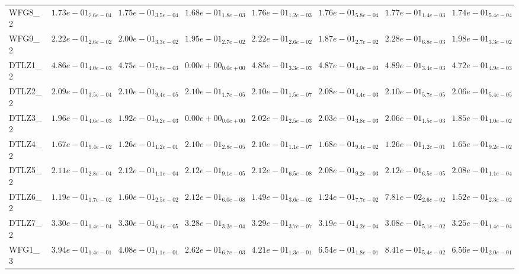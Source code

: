 \documentclass{article}
\begin{document}
\begin{landscape}
\begin{table}
\begin{scriptsize}
\begin{tabular}{llllllll}
WFG8\_2 & $  1.73e-01_{ 7.6e-04}$ & $  1.75e-01_{ 3.5e-04}$ & $  1.68e-01_{ 1.8e-03}$ & \cellcolor{gray25}$  1.76e-01_{ 1.2e-03}$ & $  1.76e-01_{ 5.8e-04}$ & \cellcolor{gray95}$  1.77e-01_{ 1.4e-03}$ & $  1.74e-01_{ 5.4e-04}$ \\
WFG9\_2 & \cellcolor{gray25}$  2.22e-01_{ 2.6e-02}$ & $  2.00e-01_{ 3.3e-02}$ & $  1.95e-01_{ 2.7e-02}$ & $  2.22e-01_{ 2.6e-02}$ & $  1.87e-01_{ 2.7e-02}$ & \cellcolor{gray95}$  2.28e-01_{ 6.8e-03}$ & $  1.98e-01_{ 3.3e-02}$ \\
DTLZ1\_2 & $  4.86e-01_{ 4.0e-03}$ & $  4.75e-01_{ 7.8e-03}$ & $  0.00e+00_{ 0.0e+00}$ & $  4.85e-01_{ 3.3e-03}$ & \cellcolor{gray25}$  4.87e-01_{ 4.0e-03}$ & \cellcolor{gray95}$  4.89e-01_{ 3.4e-03}$ & $  4.72e-01_{ 4.9e-03}$ \\
DTLZ2\_2 & $  2.09e-01_{ 3.5e-04}$ & \cellcolor{gray25}$  2.10e-01_{ 9.4e-05}$ & $  2.10e-01_{ 1.7e-05}$ & $  2.10e-01_{ 1.5e-07}$ & $  2.08e-01_{ 4.4e-03}$ & \cellcolor{gray95}$  2.10e-01_{ 5.7e-05}$ & $  2.06e-01_{ 5.4e-05}$ \\
DTLZ3\_2 & $  1.96e-01_{ 4.6e-03}$ & $  1.92e-01_{ 9.2e-03}$ & $  0.00e+00_{ 0.0e+00}$ & $  2.02e-01_{ 2.5e-03}$ & \cellcolor{gray25}$  2.03e-01_{ 3.8e-03}$ & \cellcolor{gray95}$  2.06e-01_{ 1.5e-03}$ & $  1.85e-01_{ 1.0e-02}$ \\
DTLZ4\_2 & $  1.67e-01_{ 9.4e-02}$ & $  1.26e-01_{ 1.2e-01}$ & \cellcolor{gray25}$  2.10e-01_{ 2.8e-05}$ & \cellcolor{gray95}$  2.10e-01_{ 1.1e-07}$ & $  1.68e-01_{ 9.4e-02}$ & $  1.26e-01_{ 1.2e-01}$ & $  1.65e-01_{ 9.2e-02}$ \\
DTLZ5\_2 & $  2.11e-01_{ 2.8e-04}$ & \cellcolor{gray25}$  2.12e-01_{ 1.1e-04}$ & $  2.12e-01_{ 9.1e-05}$ & $  2.12e-01_{ 6.5e-08}$ & $  2.08e-01_{ 9.2e-03}$ & \cellcolor{gray95}$  2.12e-01_{ 6.5e-05}$ & $  2.08e-01_{ 1.1e-04}$ \\
DTLZ6\_2 & $  1.19e-01_{ 1.7e-02}$ & \cellcolor{gray25}$  1.60e-01_{ 2.5e-02}$ & \cellcolor{gray95}$  2.12e-01_{ 6.0e-08}$ & $  1.49e-01_{ 3.6e-02}$ & $  1.24e-01_{ 7.7e-02}$ & $  7.81e-02_{ 2.6e-02}$ & $  1.52e-01_{ 2.3e-02}$ \\
DTLZ7\_2 & \cellcolor{gray25}$  3.30e-01_{ 1.4e-04}$ & \cellcolor{gray95}$  3.30e-01_{ 6.4e-05}$ & $  3.28e-01_{ 3.2e-04}$ & $  3.29e-01_{ 3.7e-07}$ & $  3.19e-01_{ 4.2e-04}$ & $  3.08e-01_{ 5.1e-02}$ & $  3.25e-01_{ 1.4e-04}$ \\
WFG1\_3 & $  3.94e-01_{ 1.4e-01}$ & $  4.08e-01_{ 1.1e-01}$ & $  2.62e-01_{ 6.7e-03}$ & $  4.21e-01_{ 1.3e-01}$ & $  6.54e-01_{ 1.8e-01}$ & \cellcolor{gray95}$  8.41e-01_{ 5.4e-02}$ & \cellcolor{gray25}$  6.56e-01_{ 2.0e-01}$ \\

\end{tabular}
\end{scriptsize}
\end{table}
\end{landscape}
\end{document}
